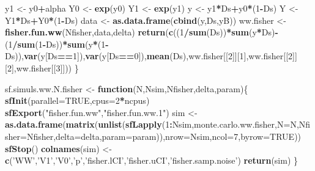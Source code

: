 \documentclass[]{book}
\newenvironment{Shaded}{\begin{snugshade}}{\end{snugshade}}
\newcommand{\KeywordTok}[1]{\textcolor[rgb]{0.13,0.29,0.53}{\textbf{#1}}}
\newcommand{\DataTypeTok}[1]{\textcolor[rgb]{0.13,0.29,0.53}{#1}}
\newcommand{\DecValTok}[1]{\textcolor[rgb]{0.00,0.00,0.81}{#1}}
\newcommand{\StringTok}[1]{\textcolor[rgb]{0.31,0.60,0.02}{#1}}
\newcommand{\OtherTok}[1]{\textcolor[rgb]{0.56,0.35,0.01}{#1}}
\newcommand{\ControlFlowTok}[1]{\textcolor[rgb]{0.13,0.29,0.53}{\textbf{#1}}}
\newcommand{\OperatorTok}[1]{\textcolor[rgb]{0.81,0.36,0.00}{\textbf{#1}}}
\newcommand{\NormalTok}[1]{#1}
\theoremstyle{definition}
\theoremstyle{definition}
\theoremstyle{definition}
\theoremstyle{remark}
\begin{document}
\begin{Shaded}
\begin{Highlighting}[]
\NormalTok{  y1 <-}\StringTok{ }\NormalTok{y0}\OperatorTok{+}\NormalTok{alpha}
\NormalTok{  Y0 <-}\StringTok{ }\KeywordTok{exp}\NormalTok{(y0)}
\NormalTok{  Y1 <-}\StringTok{ }\KeywordTok{exp}\NormalTok{(y1)}
\NormalTok{  y <-}\StringTok{ }\NormalTok{y1}\OperatorTok{*}\NormalTok{Ds}\OperatorTok{+}\NormalTok{y0}\OperatorTok{*}\NormalTok{(}\DecValTok{1}\OperatorTok{-}\NormalTok{Ds)}
\NormalTok{  Y <-}\StringTok{ }\NormalTok{Y1}\OperatorTok{*}\NormalTok{Ds}\OperatorTok{+}\NormalTok{Y0}\OperatorTok{*}\NormalTok{(}\DecValTok{1}\OperatorTok{-}\NormalTok{Ds)}
\NormalTok{  data <-}\StringTok{ }\KeywordTok{as.data.frame}\NormalTok{(}\KeywordTok{cbind}\NormalTok{(y,Ds,yB))}
\NormalTok{  ww.fisher <-}\StringTok{ }\KeywordTok{fisher.fun.ww}\NormalTok{(Nfisher,data,delta)}
  \KeywordTok{return}\NormalTok{(}\KeywordTok{c}\NormalTok{((}\DecValTok{1}\OperatorTok{/}\KeywordTok{sum}\NormalTok{(Ds))}\OperatorTok{*}\KeywordTok{sum}\NormalTok{(y}\OperatorTok{*}\NormalTok{Ds)}\OperatorTok{-}\NormalTok{(}\DecValTok{1}\OperatorTok{/}\KeywordTok{sum}\NormalTok{(}\DecValTok{1}\OperatorTok{-}\NormalTok{Ds))}\OperatorTok{*}\KeywordTok{sum}\NormalTok{(y}\OperatorTok{*}\NormalTok{(}\DecValTok{1}\OperatorTok{-}\NormalTok{Ds)),}\KeywordTok{var}\NormalTok{(y[Ds}\OperatorTok{==}\DecValTok{1}\NormalTok{]),}\KeywordTok{var}\NormalTok{(y[Ds}\OperatorTok{==}\DecValTok{0}\NormalTok{]),}\KeywordTok{mean}\NormalTok{(Ds),ww.fisher[[}\DecValTok{2}\NormalTok{]][}\DecValTok{1}\NormalTok{],ww.fisher[[}\DecValTok{2}\NormalTok{]][}\DecValTok{2}\NormalTok{],ww.fisher[[}\DecValTok{3}\NormalTok{]]))}
\NormalTok{\}}

\NormalTok{sf.simuls.ww.N.fisher <-}\StringTok{ }\ControlFlowTok{function}\NormalTok{(N,Nsim,Nfisher,delta,param)\{}
  \KeywordTok{sfInit}\NormalTok{(}\DataTypeTok{parallel=}\OtherTok{TRUE}\NormalTok{,}\DataTypeTok{cpus=}\DecValTok{2}\OperatorTok{*}\NormalTok{ncpus)}
  \KeywordTok{sfExport}\NormalTok{(}\StringTok{"fisher.fun.ww"}\NormalTok{,}\StringTok{"fisher.fun.ww.1"}\NormalTok{)}
\NormalTok{  sim <-}\StringTok{ }\KeywordTok{as.data.frame}\NormalTok{(}\KeywordTok{matrix}\NormalTok{(}\KeywordTok{unlist}\NormalTok{(}\KeywordTok{sfLapply}\NormalTok{(}\DecValTok{1}\OperatorTok{:}\NormalTok{Nsim,monte.carlo.ww.fisher,}\DataTypeTok{N=}\NormalTok{N,}\DataTypeTok{Nfisher=}\NormalTok{Nfisher,}\DataTypeTok{delta=}\NormalTok{delta,}\DataTypeTok{param=}\NormalTok{param)),}\DataTypeTok{nrow=}\NormalTok{Nsim,}\DataTypeTok{ncol=}\DecValTok{7}\NormalTok{,}\DataTypeTok{byrow=}\OtherTok{TRUE}\NormalTok{))}
  \KeywordTok{sfStop}\NormalTok{()}
  \KeywordTok{colnames}\NormalTok{(sim) <-}\StringTok{ }\KeywordTok{c}\NormalTok{(}\StringTok{'WW'}\NormalTok{,}\StringTok{'V1'}\NormalTok{,}\StringTok{'V0'}\NormalTok{,}\StringTok{'p'}\NormalTok{,}\StringTok{'fisher.lCI'}\NormalTok{,}\StringTok{'fisher.uCI'}\NormalTok{,}\StringTok{'fisher.samp.noise'}\NormalTok{)}
  \KeywordTok{return}\NormalTok{(sim)}
\NormalTok{\}}


\end{Highlighting}
\end{Shaded}
\end{document}
